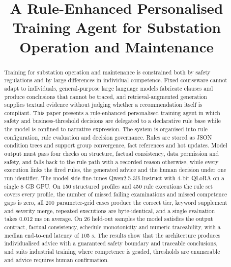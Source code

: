 \documentclass[conference]{IEEEtran}
\begin{document}
\title{A Rule-Enhanced Personalised Training Agent for Substation Operation and Maintenance}

\author{
}

\maketitle

\begin{abstract}
Training for substation operation and maintenance is constrained both by safety regulations and by large differences in individual competence. Fixed courseware cannot adapt to individuals, general-purpose large language models fabricate clauses and produce conclusions that cannot be traced, and retrieval-augmented generation supplies textual evidence without judging whether a recommendation itself is compliant. This paper presents a rule-enhanced personalised training agent in which safety and business-threshold decisions are delegated to a declarative rule base while the model is confined to narrative expression. The system is organised into rule configuration, rule evaluation and decision governance. Rules are stored as JSON condition trees and support group convergence, fact references and hot updates. Model output must pass four checks on structure, factual consistency, data permission and safety, and falls back to the rule path with a recorded reason otherwise, while every execution links the fired rules, the generated advice and the human decision under one run identifier. The model side fine-tunes Qwen2.5-3B-Instruct with 4-bit QLoRA on a single 8 GB GPU. On 150 structured profiles and 450 rule executions the rule set covers every profile, the number of missed failing examinations and missed competence gaps is zero, all 200 parameter-grid cases produce the correct tier, keyword supplement and severity merge, repeated executions are byte-identical, and a single evaluation takes 0.012 ms on average. On 26 held-out samples the model satisfies the output contract, factual consistency, schedule monotonicity and numeric traceability, with a median end-to-end latency of 105 s. The results show that the architecture produces individualised advice with a guaranteed safety boundary and traceable conclusions, and suits industrial training where competence is graded, thresholds are enumerable and advice requires human confirmation.
\end{abstract}
\end{document}
